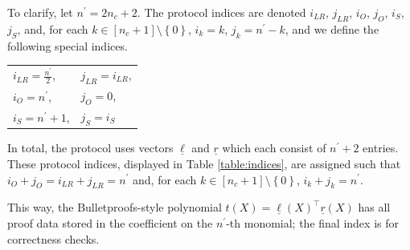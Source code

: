 \documentclass{article}
\theoremstyle{definition}
\begin{document}
To clarify, let $n^\prime = 2n_c + 2$. The protocol indices are denoted $i_{LR}$, $j_{LR}$, $i_O$, $j_O$, $i_S$, $j_S$, and, for each $k \in [n_c+1] \setminus \left\{0\right\}$, $i_k=k$, $j_k=n^\prime - k$, and we define the following special indices.
\begin{center}
	\begin{tabular}{ll}
		$i_{LR} = \frac{n^\prime}{2}$, & $j_{LR} = i_{LR}$, \\
		$i_O = n^\prime$, & $j_O = 0$, \\
		$i_S = n^\prime + 1$, & $j_S = i_S$
    \end{tabular}
\end{center}
In total, the protocol uses vectors $\underline{\ell}$ and $\underline{r}$ which each consist of $n^\prime+2$ entries. These protocol indices, displayed in Table \ref{table:indices}, are assigned such that $i_O+j_O = i_{LR}+j_{LR} = n^\prime$ and, for each $k \in [n_c+1]\setminus \left\{0\right\}$, $i_k + j_k = n^\prime$.
\begin{table}[h!]
\centering
{}
 \caption{The protocol indices; the top row provides literal index values, and the bottom row provides symbols we use in the text for those values.}
 \label{table:indices}
\end{table}
 This way, the Bulletproofs-style polynomial $t(X) = \underline{\ell}(X)^\top\underline{r}(X)$ has all proof data stored in the coefficient on the $n^\prime$-th monomial; the final index is for correctness checks.
\end{document}

